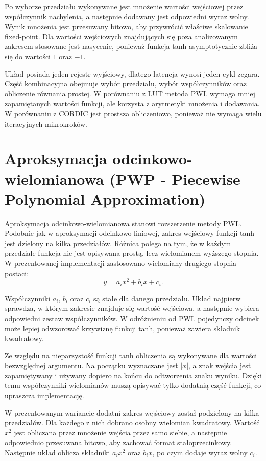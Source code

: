 \documentclass[12pt, a4paper, oneside]{scrreprt}
\begin{document}
Po wyborze przedziału wykonywane jest mnożenie wartości wejściowej przez współczynnik
nachylenia, a następnie dodawany jest odpowiedni wyraz wolny. Wynik mnożenia jest przesuwany
bitowo, aby przywrócić właściwe skalowanie fixed-point. Dla wartości wejściowych znajdujących
się poza analizowanym zakresem stosowane jest nasycenie, ponieważ funkcja tanh asymptotycznie
zbliża się do wartości $1$ oraz $-1$.

Układ posiada jeden rejestr wyjściowy, dlatego latencja wynosi jeden cykl zegara.
Część kombinacyjna obejmuje wybór przedziału, wybór współczynników oraz obliczenie
równania prostej. W porównaniu z LUT metoda PWL wymaga mniej zapamiętanych wartości
funkcji, ale korzysta z arytmetyki mnożenia i dodawania. W porównaniu z CORDIC jest
prostsza obliczeniowo, ponieważ nie wymaga wielu iteracyjnych mikrokroków.

\section{Aproksymacja odcinkowo-wielomianowa (PWP - Piecewise Polynomial Approximation)}

Aproksymacja odcinkowo-wielomianowa stanowi rozszerzenie metody PWL.
Podobnie jak w aproksymacji odcinkowo-liniowej, zakres wejściowy funkcji
tanh jest dzielony na kilka przedziałów. Różnica polega na tym, że w każdym
przedziale funkcja nie jest opisywana prostą, lecz wielomianem wyższego stopnia.
W prezentowanej implementacji zastosowano wielomiany drugiego stopnia postaci:
\[
y = a_i x^2 + b_i x + c_i.
\]

Współczynniki $a_i$, $b_i$ oraz $c_i$ są stałe dla danego przedziału.
Układ najpierw sprawdza, w którym zakresie znajduje się wartość wejściowa,
a następnie wybiera odpowiedni zestaw współczynników. W odróżnieniu od PWL
pojedynczy odcinek może lepiej odwzorować krzywiznę funkcji tanh, ponieważ
zawiera składnik kwadratowy.

Ze względu na nieparzystość funkcji tanh obliczenia są wykonywane dla wartości
bezwzględnej argumentu. Na początku wyznaczane jest $|x|$, a znak wejścia jest
zapamiętywany i używany dopiero na końcu do odtworzenia znaku wyniku.
Dzięki temu współczynniki wielomianów muszą opisywać tylko dodatnią część
funkcji, co upraszcza implementację.

W prezentowanym wariancie dodatni zakres wejściowy został podzielony na kilka przedziałów.
Dla każdego z nich dobrano osobny wielomian kwadratowy. Wartość $x^2$ jest obliczana przez
mnożenie wejścia przez samo siebie, a następnie odpowiednio przesuwana bitowo,
aby zachować format stałoprzecinkowy. Następnie układ oblicza składniki
$a_i x^2$ oraz $b_i x$, po czym dodaje wyraz wolny $c_i$.
\end{document}
